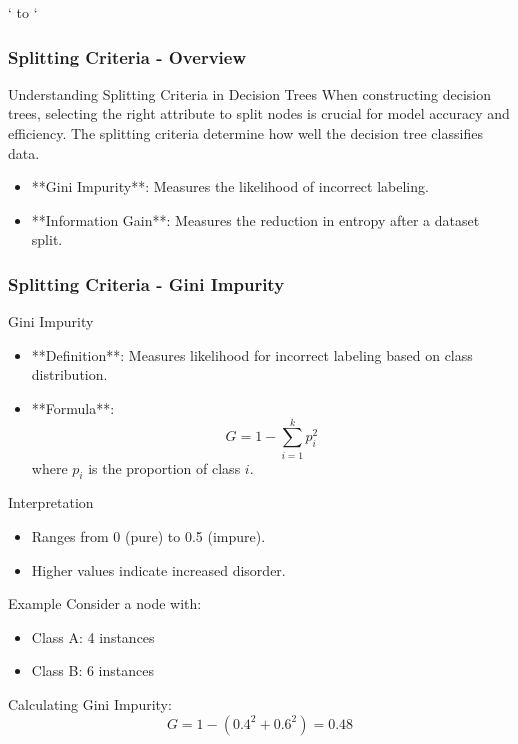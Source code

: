 \documentclass[aspectratio=169]{beamer}
\begin{document}
\begin{frame}` to `\end{frame}

\begin{frame}[fragile]
  \frametitle{Splitting Criteria - Overview}
  \begin{block}{Understanding Splitting Criteria in Decision Trees}
    When constructing decision trees, selecting the right attribute to split nodes is crucial for model accuracy and efficiency. The splitting criteria determine how well the decision tree classifies data. 
  \end{block}
  
  \begin{itemize}
    \item **Gini Impurity**: Measures the likelihood of incorrect labeling.
    \item **Information Gain**: Measures the reduction in entropy after a dataset split.
  \end{itemize}
\end{frame}

\begin{frame}[fragile]
  \frametitle{Splitting Criteria - Gini Impurity}
  \begin{block}{Gini Impurity}
    \begin{itemize}
      \item **Definition**: Measures likelihood for incorrect labeling based on class distribution.
      \item **Formula**: 
      \begin{equation}
      G = 1 - \sum_{i=1}^{k} p_i^2
      \end{equation}
      where \( p_i \) is the proportion of class \( i \).
    \end{itemize}
    
    \begin{block}{Interpretation}
      \begin{itemize}
        \item Ranges from 0 (pure) to 0.5 (impure).
        \item Higher values indicate increased disorder.
      \end{itemize}
    \end{block}
    
    \begin{block}{Example}
    Consider a node with:
    \begin{itemize}
      \item Class A: 4 instances
      \item Class B: 6 instances
    \end{itemize}
    Calculating Gini Impurity:
    \begin{equation}
      G = 1 - \left( 0.4^2 + 0.6^2 \right) = 0.48
    \end{equation}
    \end{block}
  \end{block}
\end{frame}
\end{document}
